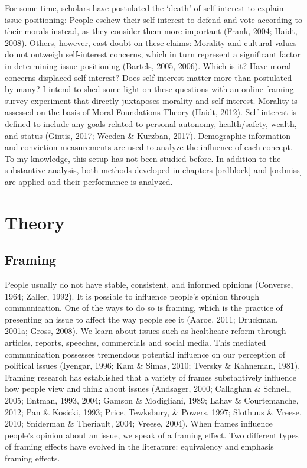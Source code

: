 \documentclass[12pt,econ]{sources/authesis}
\begin{document}
For some time, scholars have postulated the `death' of self-interest to explain issue positioning: People eschew their self-interest to defend and vote according to their morals instead, as they consider them more important (Frank, 2004; Haidt, 2008). Others, however, cast doubt on these claims: Morality and cultural values do not outweigh self-interest concerns, which in turn represent a significant factor in determining issue positioning (Bartels, 2005, 2006). Which is it? Have moral concerns displaced self-interest? Does self-interest matter more than postulated by many? I intend to shed some light on these questions with an online framing survey experiment that directly juxtaposes morality and self-interest. Morality is assessed on the basis of Moral Foundations Theory (Haidt, 2012). Self-interest is defined to include any goals related to personal autonomy, health/safety, wealth, and status (Gintis, 2017; Weeden \& Kurzban, 2017). Demographic information and conviction measurements are used to analyze the influence of each concept. To my knowledge, this setup has not been studied before. In addition to the substantive analysis, both methods developed in chapters \ref{ordblock} and \ref{ordmiss} are applied and their performance is analyzed.

\hypertarget{framing-theory}{%
\section{Theory}\label{framing-theory}}

\hypertarget{framing-theory-framing}{%
\subsection{Framing}\label{framing-theory-framing}}

People usually do not have stable, consistent, and informed opinions (Converse, 1964; Zaller, 1992). It is possible to influence people's opinion through communication. One of the ways to do so is framing, which is the practice of presenting an issue to affect the way people see it (Aaroe, 2011; Druckman, 2001a; Gross, 2008). We learn about issues such as healthcare reform through articles, reports, speeches, commercials and social media. This mediated communication possesses tremendous potential influence on our perception of political issues (Iyengar, 1996; Kam \& Simas, 2010; Tversky \& Kahneman, 1981). Framing research has established that a variety of frames substantively influence how people view and think about issues (Andsager, 2000; Callaghan \& Schnell, 2005; Entman, 1993, 2004; Gamson \& Modigliani, 1989; Lahav \& Courtemanche, 2012; Pan \& Kosicki, 1993; Price, Tewksbury, \& Powers, 1997; Slothuus \& Vreese, 2010; Sniderman \& Theriault, 2004; Vreese, 2004). When frames influence people's opinion about an issue, we speak of a framing effect. Two different types of framing effects have evolved in the literature: equivalency and emphasis framing effects.
\end{document}
